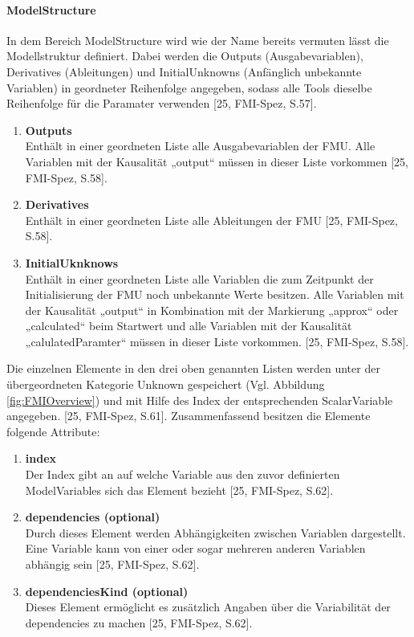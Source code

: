 \paragraph{ModelStructure}\label{sec:ModelStructure}
\noindent In dem Bereich ModelStructure wird wie der Name bereits vermuten lässt die Modellstruktur definiert. Dabei werden die Outputs (Ausgabevariablen), Derivatives (Ableitungen) und InitialUnknowns (Anfänglich unbekannte Variablen) in geordneter Reihenfolge angegeben, sodass alle Tools dieselbe Reihenfolge für die Paramater verwenden [25, FMI-Spez, S.57].
\begin{enumerate}
	\item \textbf{Outputs} \\
	Enthält in einer geordneten Liste alle Ausgabevariablen der FMU. Alle Variablen mit der 
	Kausalität „output“ müssen in dieser Liste vorkommen [25, FMI-Spez, S.58].
	\item \textbf{Derivatives} \\
	Enthält in einer geordneten Liste alle Ableitungen der FMU [25, FMI-Spez, S.58].
	\item \textbf{InitialUknknows} \\
	Enthält in einer geordneten Liste alle Variablen die zum Zeitpunkt der Initialisierung der FMU
	noch unbekannte Werte besitzen. Alle Variablen mit der Kausalität „output“ in Kombination 
	mit der Markierung „approx“ oder „calculated“ beim Startwert  und alle Variablen mit der 
	Kausalität „calulatedParamter“ müssen in dieser Liste vorkommen.
	[25, FMI-Spez, S.58].
\end{enumerate}
Die einzelnen Elemente in den drei oben genannten Listen werden unter der übergeordneten Kategorie Unknown gespeichert (Vgl. Abbildung \ref{fig:FMIOverview}) und mit Hilfe des Index der entsprechenden ScalarVariable angegeben. [25, FMI-Spez, S.61]. Zusammenfassend besitzen die Elemente folgende Attribute:
\begin{enumerate}
	\item \textbf{index} \\
	Der Index gibt an auf welche Variable aus den zuvor definierten ModelVariables sich das 
	Element bezieht [25, FMI-Spez, S.62].
	\item \textbf{dependencies (optional)} \\
	Durch dieses Element werden Abhängigkeiten zwischen Variablen dargestellt. Eine Variable
	kann von einer oder sogar mehreren anderen Variablen abhängig sein [25, FMI-Spez, S.62].
	\item \textbf{dependenciesKind (optional)} \\
	Dieses Element ermöglicht es zusätzlich Angaben über die Variabilität der dependencies zu 
	machen [25, FMI-Spez, S.62].
\end{enumerate}
